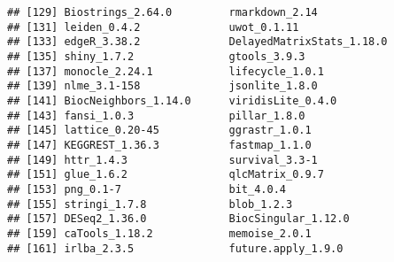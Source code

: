 \documentclass[
  openany]{book}
\begin{document}
\begin{verbatim}
## [129] Biostrings_2.64.0         rmarkdown_2.14           
## [131] leiden_0.4.2              uwot_0.1.11              
## [133] edgeR_3.38.2              DelayedMatrixStats_1.18.0
## [135] shiny_1.7.2               gtools_3.9.3             
## [137] monocle_2.24.1            lifecycle_1.0.1          
## [139] nlme_3.1-158              jsonlite_1.8.0           
## [141] BiocNeighbors_1.14.0      viridisLite_0.4.0        
## [143] fansi_1.0.3               pillar_1.8.0             
## [145] lattice_0.20-45           ggrastr_1.0.1            
## [147] KEGGREST_1.36.3           fastmap_1.1.0            
## [149] httr_1.4.3                survival_3.3-1           
## [151] glue_1.6.2                qlcMatrix_0.9.7          
## [153] png_0.1-7                 bit_4.0.4                
## [155] stringi_1.7.8             blob_1.2.3               
## [157] DESeq2_1.36.0             BiocSingular_1.12.0      
## [159] caTools_1.18.2            memoise_2.0.1            
## [161] irlba_2.3.5               future.apply_1.9.0
\end{verbatim}

\vspace{-100pt}

  
\end{document}
